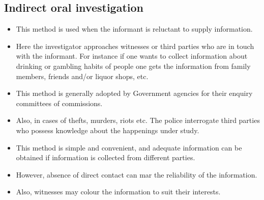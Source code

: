 \documentclass[
10pt, %
a4paper, %
]{report}
\begin{document}
\subsection{Indirect oral investigation}
\begin{itemize}
\item This method is used when the informant is reluctant to supply
information.
\item Here the investigator approaches witnesses or third parties who are in touch with the informant. For instance if one wants to collect information about drinking or gambling habits of people
one gets the information from family members, friends and/or liquor shops, etc.
\item This method is generally adopted by Government agencies for
their enquiry committees of commissions.
\item Also, in cases of thefts, murders, riots etc. The police interrogate third parties who possess knowledge about the happenings under study.
\item This method is simple and convenient, and adequate information can be obtained if information is collected from different parties.
\item However, absence of direct contact can mar the reliability of the information.
\item Also, witnesses may colour the information to suit their interests.
\end{itemize}
\end{document}

